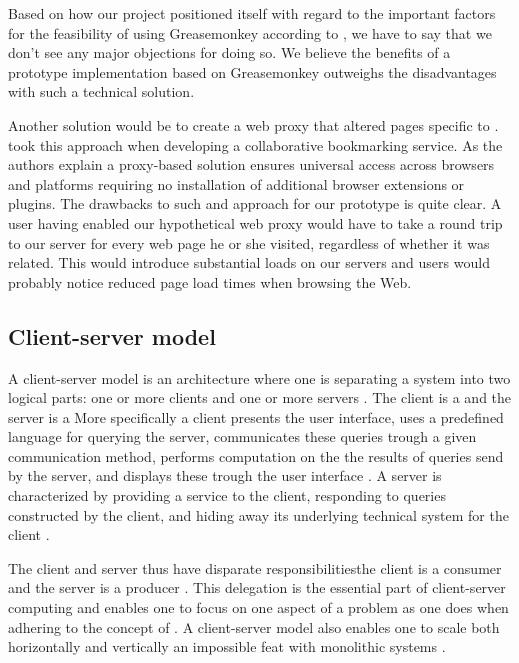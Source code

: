 \parabreak

Based on how our project positioned itself with regard to the important
factors for the feasibility of using Greasemonkey
according to \citet{laird07}, we have to say that we
don't see any major objections for doing so.
We believe the benefits of a prototype implementation
based on Greasemonkey outweighs the disadvantages with such a technical
solution.

Another solution would be to create a web proxy that altered pages specific to
\urort{}. \citet[]{keller97} took this approach when developing
a collaborative bookmarking service. As the authors explain a proxy-based
solution ensures universal access across browsers and platforms requiring no
installation of additional browser extensions or plugins. The drawbacks to
such and approach for our prototype is quite clear. A user having enabled
our hypothetical web proxy would have to take a round trip to our server for
every web page he or she visited, regardless of whether it was \urort{}
related. This would introduce substantial loads on our servers and users would
probably notice reduced page load times when browsing the Web.

\subsection{Client-server model}

A client-server model is an architecture where one is separating a system into
two logical parts:
one or more clients and one or more servers \citep[]{lewandowski98}.
The client is a 
and the server is a 
More specifically a client presents the user interface, uses a predefined
language for querying the server, communicates these queries trough a given
communication method, performs computation on the the results of queries send
by the server, and displays these trough the user interface
\citep[]{sinha92}. A server is characterized by providing a service
to the client, responding to queries constructed by the client,
and hiding away its underlying technical system for the client
\citep[]{sinha92}.

The client and server thus have disparate responsibilities\dash{}the client is
a consumer and the server is a producer \citep[]{lewandowski98}.
This delegation is the
essential part of client-server computing and enables one to focus on one
aspect of a problem as one does when adhering to the concept of
 \citep[]{dijkstra82}.
A client-server model also enables one to scale both horizontally and
vertically%
\dash{}an
impossible feat with monolithic systems \citep[]{lewandowski98}.

